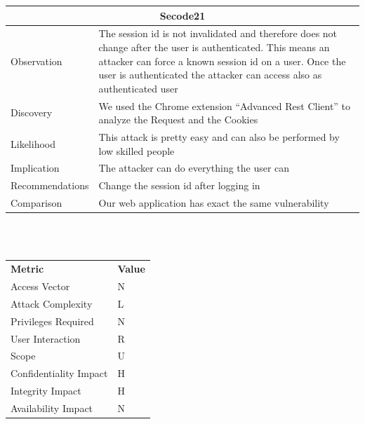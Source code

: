 \documentclass[headsepline,footsepline,footinclude=false,oneside,fontsize=11pt,paper=a4,listof=totoc,bibliography=totoc]{scrbook} %
\begin{document}
\begin{tabular}{ l|p{11cm}  }
	\hline
	\multicolumn{2}{c}{\textbf{Secode21}} \\
	\hline
	Observation   & The session id is not invalidated and therefore does not change after the user is authenticated. This means
	an attacker can force a known session id on a user. Once the user is authenticated the attacker can access also as authenticated
	user \\
	Discovery  & We used the Chrome extension ``Advanced Rest Client'' to analyze the Request and the Cookies\\
	Likelihood & This attack is pretty easy and can also be performed by low skilled people\\
	Implication    & The attacker can do everything the user can \\
	Recommendations& Change the session id after logging in \\
	Comparison& Our web application has exact the same vulnerability\\
	\hline
\end{tabular}
\\
\vspace{0.5cm}
\\
\begin{center}
	\begin{tabular}{ll}
		\rowcolor[HTML]{34CDF9}
		{\color[HTML]{ECF4FF} \textbf{Metric}}        & {\color[HTML]{ECF4FF} \textbf{Value}} \\
		\rowcolor[HTML]{BBDAFF}
		{\color[HTML]{333333} Access Vector}          & {\color[HTML]{333333} } N             \\
		\rowcolor[HTML]{ECF4FF}
		{\color[HTML]{333333} Attack Complexity}      & {\color[HTML]{333333} } L              \\
		\rowcolor[HTML]{BBDAFF}
		{\color[HTML]{333333} Privileges Required}    & {\color[HTML]{333333} } N              \\
		\rowcolor[HTML]{ECF4FF}
		{\color[HTML]{333333} User Interaction}       & {\color[HTML]{333333} } R              \\
		\rowcolor[HTML]{BBDAFF}
		{\color[HTML]{333333} Scope}                  & {\color[HTML]{333333} } U              \\
		\rowcolor[HTML]{ECF4FF}
		{\color[HTML]{333333} Confidentiality Impact} & {\color[HTML]{333333} } H              \\
		\rowcolor[HTML]{BBDAFF}
		{\color[HTML]{333333} Integrity Impact}       & {\color[HTML]{333333} } H              \\
		\rowcolor[HTML]{ECF4FF}
		{\color[HTML]{333333} Availability Impact}    & {\color[HTML]{333333} } N
	\end{tabular}
\end{center}
\pagebreak
\end{document}
